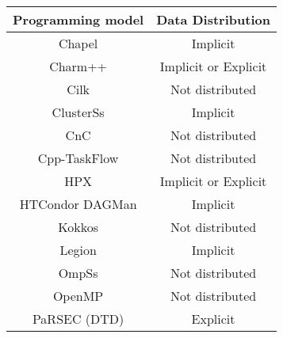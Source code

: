 \begin{tabular}{cc}
\hline
Programming model & Data Distribution \\
\hline
Chapel & Implicit\\
Charm++ & Implicit or Explicit\\
Cilk & Not distributed\\
ClusterSs & Implicit\\
CnC & Not distributed\\
Cpp-TaskFlow & Not distributed\\
HPX & Implicit or Explicit\\
HTCondor DAGMan & Implicit\\
Kokkos & Not distributed\\
Legion & Implicit\\
OmpSs & Not distributed\\
OpenMP & Not distributed\\
PaRSEC (DTD) & Explicit\\
\hline
\end{tabular}
